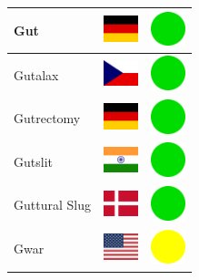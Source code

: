 \documentclass[12pt, a4paper, twoside]{report}
\begin{document}
\begin{center}
\begin{longtable}{|p{5cm}|p{2cm}|p{2cm}|}
 Gut                                                        & \includegraphics[width=1cm]{../img/flags/de} &   \includegraphics[width=1cm]{../likes/y} \\ \hline
 Gutalax                                                    & \includegraphics[width=1cm]{../img/flags/cz} &   \includegraphics[width=1cm]{../likes/y} \\ \hline
 Gutrectomy                                                 & \includegraphics[width=1cm]{../img/flags/de} &   \includegraphics[width=1cm]{../likes/y} \\ \hline
 Gutslit                                                    & \includegraphics[width=1cm]{../img/flags/in} &   \includegraphics[width=1cm]{../likes/y} \\ \hline
 Guttural Slug                                              & \includegraphics[width=1cm]{../img/flags/dk} &   \includegraphics[width=1cm]{../likes/y} \\ \hline
 Gwar                                                       & \includegraphics[width=1cm]{../img/flags/us} &   \includegraphics[width=1cm]{../likes/m} \\ \hline

\end{longtable}
\end{center}
\end{document}
